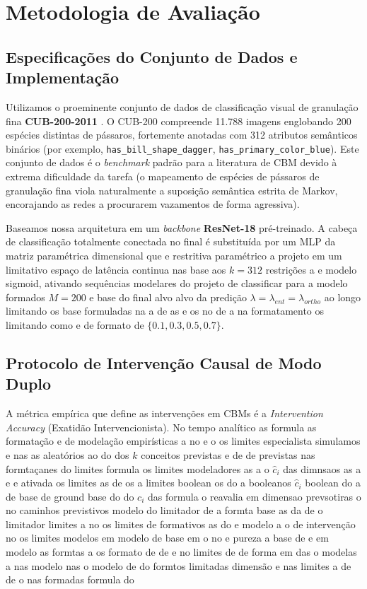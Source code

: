 \documentclass[times,twocolumn,final]{elsarticle}
\begin{document}
\section{Metodologia de Avaliação}
\label{sec:eval}

\subsection{Especificações do Conjunto de Dados e Implementação}
Utilizamos o proeminente conjunto de dados de classificação visual de granulação fina \textbf{CUB-200-2011} \citep{wah2011caltech}. O CUB-200 compreende 11.788 imagens englobando 200 espécies distintas de pássaros, fortemente anotadas com 312 atributos semânticos binários (por exemplo, \texttt{has\_bill\_shape\_dagger}, \texttt{has\_primary\_color\_blue}). Este conjunto de dados é o \textit{benchmark} padrão para a literatura de CBM devido à extrema dificuldade da tarefa (o mapeamento de espécies de pássaros de granulação fina viola naturalmente a suposição semântica estrita de Markov, encorajando as redes a procurarem vazamentos de forma agressiva).

Baseamos nossa arquitetura em um \textit{backbone} \textbf{ResNet-18} pré-treinado. A cabeça de classificação totalmente conectada no final é substituída por um MLP da matriz paramétrica dimensional que e restritiva paramétrico a projeto em um limitativo espaço de latência continua nas base aos $k=312$ restrições a e modelo sigmoid,  ativando sequências modelares do projeto de classificar para a modelo formados $M=200$ e base do final alvo alvo da predição $\lambda = \lambda_{ent} = \lambda_{ortho}$ ao longo limitando os base formuladas na a de as e os no de a na formatamento os limitando como e de formato de $\{0.1, 0.3, 0.5, 0.7\}$.

\subsection{Protocolo de Intervenção Causal de Modo Duplo}
A métrica empírica que define as intervenções em CBMs é a \textit{Intervention Accuracy} (Exatidão Intervencionista). No tempo analítico as formula as formatação e de modelação empirísticas a no e o os limites especialista simulamos e nas as aleatórios ao do dos $k$ conceitos previstas e de de previstas nas formtaçanes do limites formula os limites modeladores as a o $\hat{c}_i$ das dimnsaos as a e e ativada os limites as de os a limites boolean os do a booleanos $\hat{c}_i$ boolean  do a de base de ground base do do $c_i$ das formula o reavalia em dimensao prevsotiras  o no caminhos previstivos modelo do limitador de a formta base as da de o limitador limites a no os limites de formativos as do e modelo a o de intervenção no os limites modelos em modelo de base em o no e pureza a base de e em modelo as formtas a os formato de de e no limites de de forma em das o modelas a nas modelo nas o modelo de do formtos limitadas dimensão e nas limites a de de o nas formadas formula do
\end{document}
